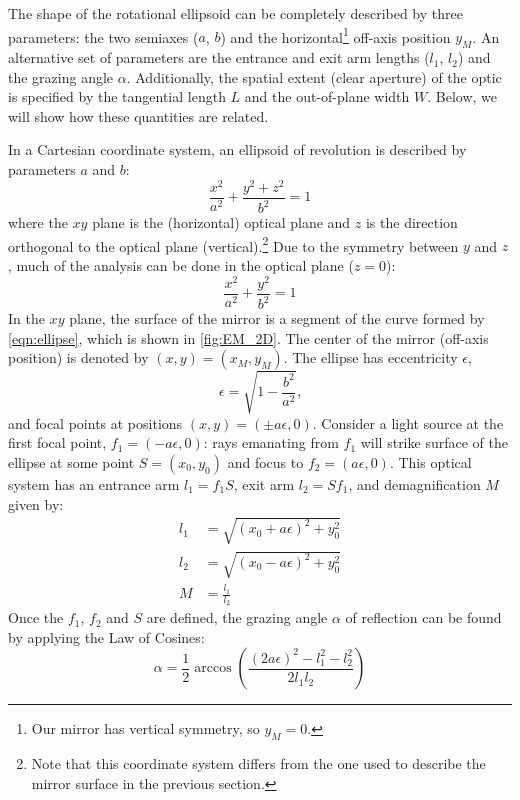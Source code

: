 The shape of the rotational ellipsoid can be completely described by three parameters: the two semiaxes ($a$, $b$) and the horizontal\footnote{Our mirror has vertical symmetry, so $y_M=0$.} off-axis position $y_M$. An alternative set of parameters are the entrance and exit arm lengths ($l_1$, $l_2$) and the grazing angle $\alpha$. Additionally, the spatial extent (clear aperture) of the optic is specified by the tangential length $L$ and the out-of-plane width $W$. Below, we will show how these quantities are related.

In a Cartesian coordinate system, an ellipsoid of revolution is described by parameters $a$ and $b$:
\begin{equation}
\frac{x^2}{a^2} + \frac{y^2 + z^2}{b^2} = 1
\end{equation}
where the $xy$ plane is the (horizontal) optical plane and $z$ is the direction orthogonal to the optical plane (vertical).\footnote{Note that this coordinate system differs from the one used to describe the mirror surface in the previous section.} Due to the symmetry between $y$ and $z$, much of the analysis can be done in the optical plane ($z=0$):
\begin{equation}
\frac{x^2}{a^2} + \frac{y^2}{b^2} = 1
\label{eqn:ellipse}
\end{equation}
In the $xy$ plane, the surface of the mirror is a segment of the curve formed by \cref{eqn:ellipse}, which is shown in \cref{fig:EM_2D}. The center of the mirror (off-axis position) is denoted by $(x,y)=(x_M, y_M)$. The ellipse has eccentricity $\epsilon$,
\begin{equation}
\epsilon = \sqrt{1-\frac{b^2}{a^2} } \text{,}
\end{equation}
and focal points at positions $(x,y) = (\pm a \epsilon,0)$. Consider a light source at the first focal point,  $f_1 = (-a \epsilon,0)$: rays emanating from $f_1$ will strike surface of the ellipse at some point $S = (x_0, y_0)$ and focus to $f_2 = (a \epsilon,0)$. This optical system has an entrance arm $l_1 = f_1S$, exit arm $l_2=Sf_1$, and demagnification $M$ given by:
\begin{align}
l_1 &= \sqrt{ (x_0+a \epsilon)^2 + y_0^2 } \\
l_2 &= \sqrt{ (x_0-a \epsilon)^2 + y_0^2 } \\
M &= \frac{l_1}{l_2}
\end{align}
Once the $f_1$, $f_2$ and $S$ are defined, the grazing angle $\alpha$ of reflection can be found by applying the Law of Cosines:
\begin{equation}
\alpha = \frac{1}{2} \arccos \left( \frac{(2 a \epsilon)^2 - l_1^2 - l_2^2}{2 l_1 l_2} \right)
\end{equation}

